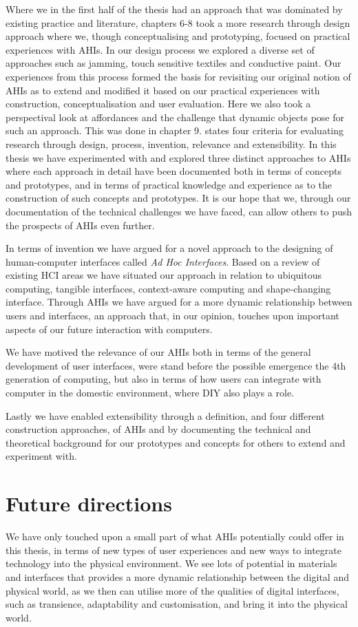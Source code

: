 Where we in the first half of the thesis had an approach that was dominated by existing practice and literature, chapters 6-8 took a more research through design approach where we, though conceptualising and prototyping, focused on practical experiences with AHIs.
In our design process we explored a diverse set of approaches such as jamming, touch sensitive textiles and conductive paint.
Our experiences from this process formed the basis for revisiting our original notion of AHIs as to extend and modified it based on our practical experiences with construction, conceptualisation and user evaluation.
Here we also took a perspectival look at affordances and the challenge that dynamic objects pose for such an approach.
This was done in chapter 9.
\blank
\citet{zimmerman2007research} states four criteria for evaluating research through design, process, invention, relevance and extensibility.
In this thesis we have experimented with and explored three distinct approaches to AHIs where each approach in detail have been documented both in terms of concepts and prototypes, and in terms of practical knowledge and experience as to the construction of such concepts and prototypes.
It is our hope that we, through our documentation of the technical challenges we have faced, can allow others to push the prospects of AHIs even further.

In terms of invention we have argued for a novel approach to the designing of human-computer interfaces called \emph{Ad Hoc Interfaces}.
Based on a review of existing HCI areas we have situated our approach in relation to ubiquitous computing, tangible interfaces, context-aware computing and shape-changing interface.
Through AHIs we have argued for a more dynamic relationship between users and interfaces, an approach that, in our opinion, touches upon important aspects of our future interaction with computers.

We have motived the relevance of our AHIs both in terms of the general development of user interfaces, were stand before the possible emergence the 4th generation of computing, but also in terms of how users can integrate with computer in the domestic environment, where DIY also plays a role.

Lastly we have enabled extensibility through a definition, and four different construction approaches, of AHIs and by documenting the technical and theoretical background for our prototypes and concepts for others to extend and experiment with.

\section{Future directions}
We have only touched upon a small part of what AHIs potentially could offer in this thesis, in terms of new types of user experiences and new ways to integrate technology into the physical environment.
We see lots of potential in materials and interfaces that provides a more dynamic relationship between the digital and physical world, as we then can utilise more of the qualities of digital interfaces, such as transience, adaptability and customisation, and bring it into the physical world.

